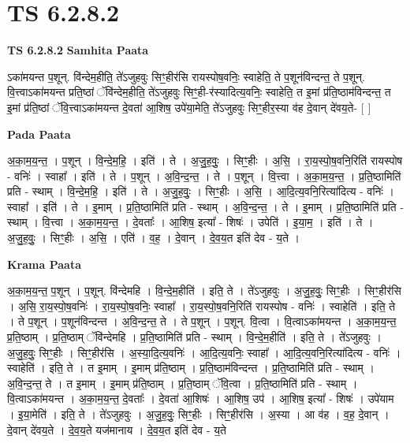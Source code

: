 \documentclass[17pt]{extarticle}
\begin{document}
\section{ TS 6.2.8.2 }

\textbf{TS 6.2.8.2 } \newline
\textbf{Samhita Paata} \newline

ऽका॑मयन्त प॒शून्. वि॑न्देम॒हीति॒ ते॑ऽजुहवुः सिꣳ॒॒हीर॑सि रायस्पोष॒वनिः॒ स्वाहेति॒ ते प॒शून॑विन्दन्त॒ ते प॒शून्. वि॒त्त्वाऽका॑मयन्त प्रति॒ष्ठां ॅवि॑न्देम॒हीति॒ ते॑ऽजुहवुः सिꣳ॒॒ही-र॑स्यादित्य॒वनिः॒ स्वाहेति॒ त इ॒मां प्र॑ति॒ष्ठाम॑विन्दन्त॒ त इ॒मां प्र॑ति॒ष्ठां ॅवि॒त्त्वाऽका॑मयन्त दे॒वता॑ आ॒शिष॒ उपे॑या॒मेति॒ ते॑ऽजुहवुः सिꣳ॒॒हीर॒स्या व॑ह दे॒वान् दे॑वय॒ते- [  ] \newline

\textbf{Pada Paata} \newline

अ॒का॒म॒य॒न्त॒ । प॒शून् । वि॒न्दे॒म॒हि॒ । इति॑ । ते । अ॒जु॒ह॒वुः॒ । सिꣳ॒॒हीः । अ॒सि॒ । रा॒य॒स्पो॒ष॒वनि॒रिति॑ रायस्पोष - वनिः॑ । स्वाहा᳚ । इति॑ । ते । प॒शून् । अ॒वि॒न्द॒न्त॒ । ते । प॒शून् । वि॒त्त्वा । अ॒का॒म॒य॒न्त॒ । प्र॒ति॒ष्ठामिति॑ प्रति - स्थाम् । वि॒न्दे॒म॒हि॒ । इति॑ । ते । अ॒जु॒ह॒वुः॒ । सिꣳ॒॒हीः । अ॒सि॒ । आ॒दि॒त्य॒वनि॒रित्या॑दित्य - वनिः॑ । स्वाहा᳚ । इति॑ । ते । इ॒माम् । प्र॒ति॒ष्ठामिति॑ प्रति - स्थाम् । अ॒वि॒न्द॒न्त॒ । ते । इ॒माम् । प्र॒ति॒ष्ठामिति॑ प्रति - स्थाम् । वि॒त्त्वा । अ॒का॒म॒य॒न्त॒ । दे॒वताः᳚ । आ॒शिष॒ इत्या᳚ - शिषः॑ । उपेति॑ । इ॒या॒म॒ । इति॑ । ते । अ॒जु॒ह॒वुः॒ । सिꣳ॒॒हीः । अ॒सि॒ । एति॑ । व॒ह॒ । दे॒वान् । दे॒व॒य॒त इति॑ देव - य॒ते ।  \newline


\textbf{Krama Paata} \newline

अ॒का॒म॒य॒न्त॒ प॒शून् । प॒शून्. वि॑न्देमहि । वि॒न्दे॒म॒हीति॑ । इति॒ ते । ते॑ऽजुहवुः । अ॒जु॒ह॒वुः॒ सिꣳ॒॒हीः । 
सिꣳ॒॒हीर॑सि । अ॒सि॒ रा॒य॒स्पो॒ष॒वनिः॑ । रा॒य॒स्पो॒ष॒वनिः॒ स्वाहा᳚ । रा॒य॒स्पो॒ष॒वनि॒रिति॑ रायस्पोष - वनिः॑ । स्वाहेति॑ । इति॒ ते । ते प॒शून् । प॒शून॑विन्दन्त । अ॒वि॒न्द॒न्त॒ ते । ते प॒शून् । प॒शून्. वि॒त्वा । वि॒त्वाऽका॑मयन्त । अ॒का॒म॒य॒न्त॒ प्र॒ति॒ष्ठाम् । प्र॒ति॒ष्ठाम् ॅवि॑न्देमहि । प्र॒ति॒ष्ठामिति॑ प्रति - स्थाम् । वि॒न्दे॒म॒हीति॑ । इति॒ ते । ते॑ऽजुहवुः । अ॒जु॒ह॒वुः॒ सिꣳ॒॒हीः । सिꣳ॒॒हीर॑सि । अ॒स्या॒दि॒त्य॒वनिः॑ । आ॒दि॒त्य॒वनिः॒ स्वाहा᳚ । आ॒दि॒त्य॒वनि॒रित्या॑दित्य - वनिः॑ । स्वाहेति॑ । इति॒ ते । त इ॒माम् । इ॒माम् प्र॑ति॒ष्ठाम् । प्र॒ति॒ष्ठाम॑विन्दन्त । प्र॒ति॒ष्ठामिति॑ प्रति - स्थाम् । अ॒वि॒न्द॒न्त॒ ते । त इ॒माम् । इ॒माम् प्र॑ति॒ष्ठाम् । प्र॒ति॒ष्ठाम् ॅवि॒त्वा । प्र॒ति॒ष्ठामिति॑ प्रति - स्थाम् । वि॒त्वाऽका॑मयन्त । अ॒का॒म॒य॒न्त॒ दे॒वताः᳚ । दे॒वता॑ आ॒शिषः॑ । आ॒शिष॒ उप॑ । आ॒शिष॒ इत्या᳚ - शिषः॑ । उपे॑याम । इ॒या॒मेति॑ । इति॒ ते । ते॑ऽजुहवुः । अ॒जु॒ह॒वुः॒ सिꣳ॒॒हीः । सिꣳ॒॒हीर॑सि । अ॒स्या । आ व॑ह । व॒ह॒ दे॒वान् । दे॒वान् दे॑वय॒ते । दे॒व॒य॒ते यज॑मानाय । दे॒व॒य॒त इति॑ देव - य॒ते \newline
\end{document}
